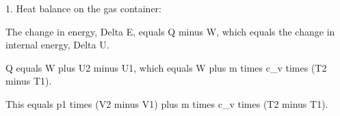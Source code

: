 1. Heat balance on the gas container:

The change in energy, Delta E, equals Q minus W, which equals the change in internal energy, Delta U.

Q equals W plus U2 minus U1, which equals W plus m times c_v times (T2 minus T1).

This equals p1 times (V2 minus V1) plus m times c_v times (T2 minus T1).